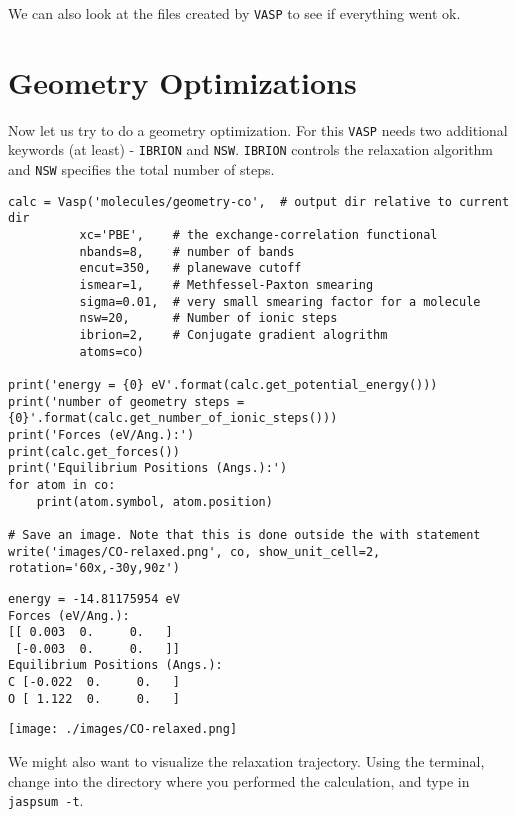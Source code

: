 \documentclass[11pt]{article}
\begin{document}
We can also look at the files created by \texttt{VASP} to see if everything went ok. 



\section{Geometry Optimizations}
\label{sec:orgd2127d7}

Now let us try to do a geometry optimization. For this \texttt{VASP} needs two additional keywords (at least) - \texttt{IBRION} and \texttt{NSW}. \texttt{IBRION} controls the relaxation algorithm and \texttt{NSW} specifies the total number of steps.

\begin{verbatim}
calc = Vasp('molecules/geometry-co',  # output dir relative to current dir
          xc='PBE',    # the exchange-correlation functional
          nbands=8,    # number of bands
          encut=350,   # planewave cutoff
          ismear=1,    # Methfessel-Paxton smearing
          sigma=0.01,  # very small smearing factor for a molecule
          nsw=20,      # Number of ionic steps
          ibrion=2,    # Conjugate gradient alogrithm
          atoms=co)

print('energy = {0} eV'.format(calc.get_potential_energy()))
print('number of geometry steps = {0}'.format(calc.get_number_of_ionic_steps()))
print('Forces (eV/Ang.):')
print(calc.get_forces())
print('Equilibrium Positions (Angs.):')
for atom in co:
    print(atom.symbol, atom.position)
    
# Save an image. Note that this is done outside the with statement
write('images/CO-relaxed.png', co, show_unit_cell=2, rotation='60x,-30y,90z')
\end{verbatim}

\begin{verbatim}
energy = -14.81175954 eV
Forces (eV/Ang.):
[[ 0.003  0.     0.   ]
 [-0.003  0.     0.   ]]
Equilibrium Positions (Angs.):
C [-0.022  0.     0.   ]
O [ 1.122  0.     0.   ]
\end{verbatim}

\begin{center}
\texttt{[image: ./images/CO-relaxed.png]}
\end{center}


We might also want to visualize the relaxation trajectory. Using the terminal, change into the directory where you performed the calculation, and type in \texttt{jaspsum -t}.
\end{document}
